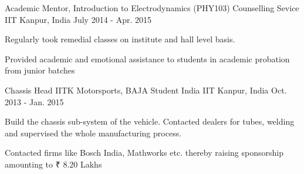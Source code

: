 

\begin{cventries}

  \cventry
    {Academic Mentor, Introduction to Electrodynamics (PHY103)} %
    {Counselling Sevice} %
    {IIT Kanpur, India} %
    {July 2014 - Apr. 2015} %
    {
      \begin{cvitems} %
		\item {Regularly took remedial classes on institute and hall level basis.}
		\item {Provided academic and emotional assistance to students in academic probation from junior batches}
      \end{cvitems}
    }

  \cventry
    {Chassis Head} %
    {IITK Motorsports, BAJA Student India} %
    {IIT Kanpur, India} %
    {Oct. 2013 - Jan. 2015} %
    {
      \begin{cvitems} %
		\item {Build the chassis sub-system of the vehicle. Contacted dealers for tubes, welding and supervised the whole manufacturing process.}
		\item {Contacted firms like Bosch India, Mathworks etc. thereby raising sponsorship amounting to ₹ 8.20 Lakhs}
      \end{cvitems}
    }


\end{cventries}
